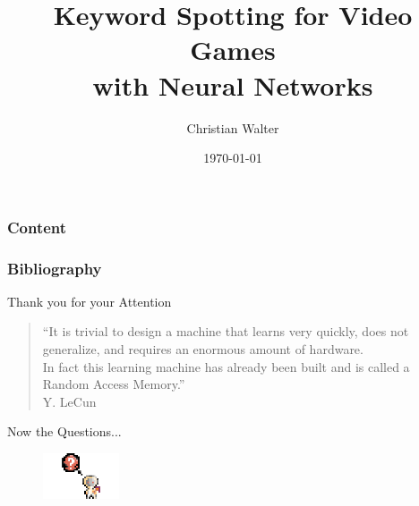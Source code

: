 \documentclass{beamer}
\title[Keyword Spotting for Video Games with Neural Networks]{Keyword Spotting for Video Games\\with Neural Networks}
\author{Christian Walter}
\date{\today}
\begin{document}
\titleframe

\begin{frame}
  \frametitle{Content}
  \tableofcontents
\end{frame}














\begin{frame}
  \frametitle{Bibliography}
  \printbibliography
\end{frame}

\begin{frame}
  \Large
  \centering
  \vfill
  Thank you for your Attention
  \begin{quote}
    \scriptsize
    \vspace{0.5cm}
    \enquote{It is trivial to design a machine that learns very quickly, does not generalize, and requires an enormous amount of hardware.\\
    In fact this learning machine has already been built and is called a Random Access Memory.}\\
    \vspace{0.25cm}
    Y. LeCun
  \end{quote}
  \vspace{0.25cm}
  Now the Questions...
  \begin{figure} \includegraphics[width=0.2\textwidth]{../6_game/figs/game_design_mechanic_bubble_question.png} \end{figure}
\end{frame}
\end{document}
